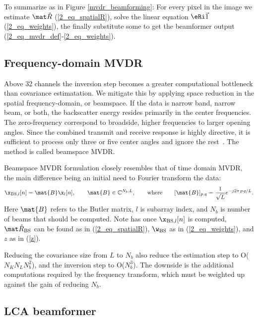 {To summarize as in Figure \ref{mvdr_beamforming}: For every pixel in the image we estimate $\eR$ (\ref{2_eq_spatialR}), solve the linear equation $\eRi\1$ (\ref{2_eq_weights}), the finally substitute some to get the beamformer output (\ref{2_eq_mvdr_def}-\ref{2_eq_weights}).



\subsection{Frequency-domain MVDR}

Above 32 channels the inversion step becomes a greater computational bottleneck than covariance estimatation. We mitigate this by applying space reduction in the spatial frequency-domain, or beamspace. If the data is narrow band, narrow beam, or both, the backscatter energy resides primarily in the center frequencies. The zero-frequency correspond to broadside, higher frequencies to larger opening angles. Since the combined transmit and receive response is highly directive, it is sufficient to process only three or five center angles and ignore the rest~\cite{Nilsen2009a,VanTrees2002}. The method is called beamspace MVDR.

Beamspace MVDR formulation closely resembles that of time domain MVDR, the main difference being an initial need to Fourier transform the data:
%
\begin{gather}
\x_{\text{BS},l}[n] = \mat{B}\x_l[n], \qquad \mat{B}\in \mathbb{C}^{N_b,L}, \qquad \text{where} \qquad [\mat{B}]_{p,q} = \frac{1}{\sqrt{L}} e^{-j2\pi\,p\,q/L}.\label{2_eq_beamspace}
\end{gather}
%
Here $\mat{B}$ refers to the Butler matrix, $l$ is subarray index, and $N_b$ is number of beams that should be computed. Note has once $\x_{\text{BS},l}[n]$ is computed, $\eR_\text{BS}$ can be found as in (\ref{2_eq_spatialR}), $\w_\text{BS}$ as in (\ref{2_eq_weights}), and $z$ as in (\ref{z}).

Reducing the covariance size from $L$ to $N_b$ also reduce the estimation step to O($N_K N_L N_b^2$), and the inversion step to O($N_b^3$). The downside is the additional computations required by the frequency transform, which must be weighted up against the gain of reducing $N_b$.



\subsection{LCA beamformer}

}

